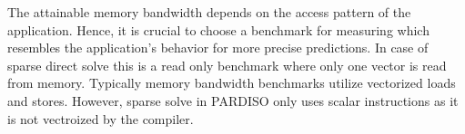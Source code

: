 % 
% 

The attainable memory bandwidth depends on the access pattern of the
application.
Hence, it is crucial to choose a benchmark for measuring which resembles the
application's behavior for more precise predictions.
In case of sparse direct solve this is a read only benchmark where only one
vector is read from memory. 
%
Typically memory bandwidth benchmarks utilize vectorized loads and stores.
However, sparse solve in PARDISO only uses scalar instructions as it is not
vectroized by the compiler.

